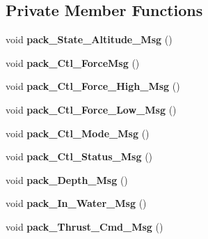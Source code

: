 \subsection*{Private Member Functions}
\begin{DoxyCompactItemize}
\item 
\mbox{\label{classSTATE__reader_ac6039aa79525ccf563dff9533ad73e61}} 
void {\bfseries pack\+\_\+\+State\+\_\+\+Altitude\+\_\+\+Msg} ()
\item 
\mbox{\label{classSTATE__reader_a26bf79b10d1a03997a1d67d2042597cd}} 
void {\bfseries pack\+\_\+\+Ctl\+\_\+\+Force\+Msg} ()
\item 
\mbox{\label{classSTATE__reader_af49b7d23c8485ecf1b2bb4bc5750a92c}} 
void {\bfseries pack\+\_\+\+Ctl\+\_\+\+Force\+\_\+\+High\+\_\+\+Msg} ()
\item 
\mbox{\label{classSTATE__reader_aebe95f57ffbe91c5e476332fdabd875d}} 
void {\bfseries pack\+\_\+\+Ctl\+\_\+\+Force\+\_\+\+Low\+\_\+\+Msg} ()
\item 
\mbox{\label{classSTATE__reader_a408df34fba0495e11815a5496e788bf2}} 
void {\bfseries pack\+\_\+\+Ctl\+\_\+\+Mode\+\_\+\+Msg} ()
\item 
\mbox{\label{classSTATE__reader_adc74eeeaf4ae6dfe09969a5969f23da2}} 
void {\bfseries pack\+\_\+\+Ctl\+\_\+\+Status\+\_\+\+Msg} ()
\item 
\mbox{\label{classSTATE__reader_a9dd459012dfb01e0df4139e67552f7b3}} 
void {\bfseries pack\+\_\+\+Depth\+\_\+\+Msg} ()
\item 
\mbox{\label{classSTATE__reader_a04869d6faec3302dd90e4b2b57b84142}} 
void {\bfseries pack\+\_\+\+In\+\_\+\+Water\+\_\+\+Msg} ()
\item 
\mbox{\label{classSTATE__reader_ad834d9a70b1d7cc2ed0e96d0e50e94a9}} 
void {\bfseries pack\+\_\+\+Thrust\+\_\+\+Cmd\+\_\+\+Msg} ()
\item 
\mbox{\label{classSTATE__reader_ac873b20c9bb3ade796f58d2c2bdfab59}} 

\end{DoxyCompactItemize}
